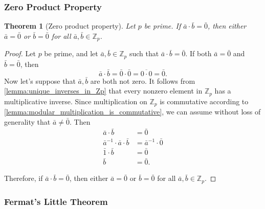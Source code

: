 \documentclass[10pt, titlepage]{amsart}
\newcommand\Z{{\mathbb Z}}
\newtheorem{theorem}{Theorem}[subsection]
\theoremstyle{definition}
\begin{document}
	
	\subsubsection{Zero Product Property}
	
	\begin{theorem}[Zero product property]\label{corollary:zero_product_property}
		Let $p$ be prime. If $\bar{a} \cdot \bar{b} = \bar{0}$, then either $\bar{a} = \bar{0}$ or $\bar{b} = \bar{0}$ for all $\bar{a}, \bar{b} \in \Z_p$.
	\end{theorem}

	\begin{proof}
		Let $p$ be prime, and let $\bar{a}, \bar{b} \in \Z_p$ such that $\bar{a} \cdot \bar{b} = \bar{0}$.
		If both $\bar{a} = \bar{0}$ and $\bar{b} = \bar{0}$, then $$\bar{a} \cdot \bar{b} = \bar{0} \cdot \bar{0} = \overline{0 \cdot 0} = \bar{0}.$$
		Now let's suppose that $\bar{a}, \bar{b}$ are both not zero.
		It follows from \cref{lemma:unique_inverses_in_Zp} that every nonzero element in $\Z_p$ has a multiplicative inverse.
		Since multiplication on $\Z_p$ is commutative according to \cref{lemma:modular_multiplication_is_commutative}, we can assume without loss of generality that $\bar{a} \neq \bar{0}$. Then 
		\begin{align*}
			\bar{a} \cdot \bar{b} &= \bar{0} \\
			\bar{a}^{-1} \cdot \bar{a} \cdot \bar{b} &= \bar{a}^{-1} \cdot \bar{0} \\
			\bar{1} \cdot \bar{b} &= \bar{0} \\
			\bar{b} &= \bar{0}.
		\end{align*}
		
		Therefore, if $\bar{a} \cdot \bar{b} = \bar{0}$, then either $\bar{a} = \bar{0}$ or $\bar{b} = \bar{0}$ for all $\bar{a}, \bar{b} \in \Z_p$.
				
	\end{proof}
	
	\subsubsection{Fermat's Little Theorem}
	
\end{document}
